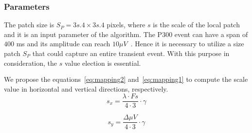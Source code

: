 \documentclass[entropy,article,submit,moreauthors,pdftex,10pt,a4paper]{mdpi}
\begin{document}


\subsubsection{Parameters}

The patch size is $S_P = 3s.4 \times 3s.4$ pixels, where $s$ is the scale of the local patch and it is an input parameter of the algorithm. The P300 event can have a span of $400$ ms and its amplitude can reach $ 10 \mu V $~\citep{Rao2013}.  Hence it is necessary to utilize a size patch $S_P$ that could capture an entire transient event. With this purpose in consideration, the $s$ value election is essential.

We propose the equations~\ref{eq:mapping2} and~\ref{eq:mapping1} to compute the scale value in horizontal and vertical directions, respectively. 
\begin{equation}
s_x = \frac{\lambda \cdot Fs}{4 \cdot 3} \cdot \gamma
\label{eq:mapping2}
\end{equation}

\begin{equation}
s_y= \frac{\Delta \mu V}{4 \cdot 3} \cdot \gamma 
\label{eq:mapping1}
\end{equation}
\end{document}
